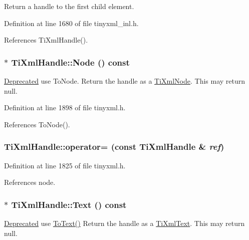 Return a handle to the first child element. 

Definition at line 1680 of file tinyxml\_\-inl.h.

References TiXmlHandle().\hypertarget{class_ti_xml_handle_ab44b723a8dc9af72838a303c079d0376}{
\subsubsection[{Node}]{$\ast$ TiXmlHandle::Node () const}}
\label{class_ti_xml_handle_ab44b723a8dc9af72838a303c079d0376}
\begin{Desc}
\item[\hyperlink{deprecated__deprecated000002}{Deprecated}]use ToNode. Return the handle as a \hyperlink{class_ti_xml_node}{TiXmlNode}. This may return null. \end{Desc}


Definition at line 1898 of file tinyxml.h.

References ToNode().\hypertarget{class_ti_xml_handle_ad8e5dcf6a87882674203157f29f8e4db}{
\subsubsection[{operator=}]{ TiXmlHandle::operator= (const {\bf TiXmlHandle} \& {\em ref})}}
\label{class_ti_xml_handle_ad8e5dcf6a87882674203157f29f8e4db}


Definition at line 1825 of file tinyxml.h.

References node.\hypertarget{class_ti_xml_handle_a9fc739c8a18d160006f82572fc143d13}{
\subsubsection[{Text}]{$\ast$ TiXmlHandle::Text () const}}
\label{class_ti_xml_handle_a9fc739c8a18d160006f82572fc143d13}
\begin{Desc}
\item[\hyperlink{deprecated__deprecated000004}{Deprecated}]use \hyperlink{class_ti_xml_handle_a4ac53a652296203a5b5e13854d923586}{ToText()} Return the handle as a \hyperlink{class_ti_xml_text}{TiXmlText}. This may return null. \end{Desc}


